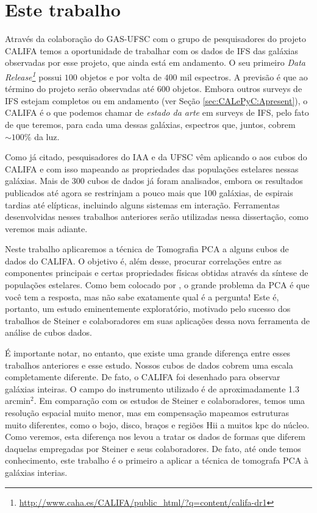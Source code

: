 \section{Este trabalho}
\label{sec:Intro:ThisWork}

Através da colaboração do GAS-UFSC com o grupo de pesquisadores do projeto CALIFA temos a oportunidade de trabalhar com
os dados de IFS das galáxias observadas por esse projeto, que ainda está em andamento. O seu primeiro {\em Data
Release\footnote{\url{http://www.caha.es/CALIFA/public_html/?q=content/califa-dr1}}} \citep[][DR1]{Husemann2013} possui
$100$ objetos e por volta de $400$ mil espectros. A previsão é que ao término do projeto serão observadas até $600$
objetos. Embora outros surveys de IFS estejam completos ou em andamento (ver Seção \ref{sec:CALePyC:Apresent}), o CALIFA
é o que podemos chamar de {\em estado da arte} em surveys de IFS, pelo fato de que teremos, para cada uma dessas
galáxias, espectros que, juntos, cobrem $\sim 100$\% da luz.

Como já citado, pesquisadores do IAA e da UFSC vêm aplicando o \starlight aos cubos do CALIFA e com isso mapeando as
propriedades das populações estelares nessas galáxias. Mais de 300 cubos de dados já foram analisados, embora os
resultados publicados até agora se restrinjam a pouco mais que 100 galáxias, de espirais tardias até elípticas,
incluindo alguns sistemas em interação. Ferramentas desenvolvidas nesses trabalhos anteriores serão utilizadas nessa
dissertação, como veremos mais adiante.

Neste trabalho aplicaremos a técnica de Tomografia PCA a alguns cubos de dados do CALIFA. O objetivo é, além desse,
procurar correlações entre as componentes principais e certas propriedades físicas obtidas através da síntese de
populações estelares. Como bem colocado por \citet{Steiner2009}, o grande problema da PCA é que você tem a resposta, mas
não sabe exatamente qual é a pergunta! Este é, portanto, um estudo eminentemente exploratório, motivado pelo sucesso dos
trabalhos de Steiner e colaboradores em suas aplicações dessa nova ferramenta de análise de cubos dados.

É importante notar, no entanto, que existe uma grande diferença entre esses trabalhos anteriores e esse estudo.  Nossos
cubos de dados cobrem uma escala completamente diferente. De fato, o CALIFA foi desenhado para observar galáxias
inteiras. O campo do instrumento utilizado é de aproximadamente 1.3 arcmin$^2$. Em comparação com os estudos de Steiner
e colaboradores, temos uma resolução espacial muito menor, mas em compensação mapeamos estruturas muito diferentes,
como o bojo, disco, braços e regiões H{\sc ii} a muitos kpc do núcleo. Como veremos, esta diferença nos levou a tratar
os dados de formas que diferem daquelas empregadas por Steiner e seus colaboradores. De fato, até onde temos conhecimento,
este trabalho é o primeiro a aplicar a técnica de tomografa PCA à galáxias interias.

